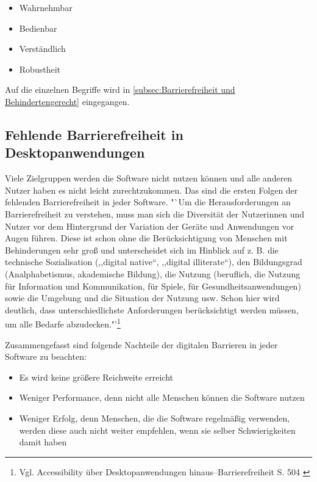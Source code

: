 \begin{itemize}
	\item Wahrnehmbar
	\item Bedienbar
	\item Verständlich
	\item Robustheit
\end{itemize}

Auf die einzelnen Begriffe wird in \cref{subsec:Barrierefreiheit und Behindertengerecht} eingegangen.

\subsection{Fehlende Barrierefreiheit in Desktopanwendungen}
\label{subsec: Fehlende Barrierefreiheit in Desktopanwendungen}

Viele Zielgruppen werden die Software nicht nutzen können und alle anderen Nutzer haben es nicht leicht zurechtzukommen. Das sind die ersten Folgen der fehlenden Barrierefreiheit in jeder Software. "`Um die Herausforderungen an Barrierefreiheit zu verstehen, muss man sich die Diversität der Nutzerinnen und Nutzer vor dem Hintergrund der Variation der Geräte und Anwendungen vor Augen führen. Diese ist schon ohne die Berücksichtigung von Menschen mit Behinderungen sehr groß und unterscheidet sich im Hinblick auf z. B. die technische Sozialisation (,,digital native“, ,,digital illiterate“), den Bildungsgrad (Analphabetismus, akademische Bildung), die Nutzung (beruflich, die Nutzung für Information und Kommunikation, für Spiele, für Gesundheitsanwendungen) sowie die Umgebung und die Situation der Nutzung usw. Schon hier wird deutlich, dass unterschiedlichste Anforderungen berücksichtigt werden müssen, um alle Bedarfe abzudecken."'\footnote{Vgl. Accessibility über Desktopanwendungen hinaus–Barrierefreiheit S. 504 \cite{buhler2017accessibility}}

Zusammengefasst sind folgende Nachteile der digitalen Barrieren in jeder Software zu beachten:
\vspace{1em}

\begin{itemize}
	\item Es wird keine größere Reichweite erreicht
	\item Weniger Performance, denn nicht alle Menschen können die Software nutzen
	\item Weniger Erfolg, denn Menschen, die die Software regelmäßig verwenden, werden diese auch nicht weiter empfehlen, wenn sie selber Schwierigkeiten damit haben
\end{itemize}

